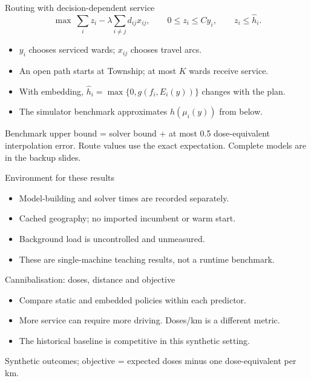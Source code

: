 \begin{frame}{Routing with decision-dependent service}
  \[
    \max\ \sum_i z_i-\lambda\sum_{i\ne j}d_{ij}x_{ij},\qquad
    0\le z_i\le Cy_i,\qquad z_i\le \widehat h_i.
  \]
  \begin{itemize}
    \item $y_i$ chooses serviced wards; $x_{ij}$ chooses travel arcs.
    \item An open path starts at Township; at most $K$ wards receive service.
    \item With embedding, $\widehat h_i=\max\{0,g(f_i,E_i(y))\}$ changes with the plan.
    \item The simulator benchmark approximates $h(\mu_i(y))$ from below.
  \end{itemize}
  \vspace{3mm}
  Benchmark upper bound = solver bound + at most 0.5 dose-equivalent interpolation error. Route values use the exact expectation. Complete models are in the backup slides.
\end{frame}

\begin{frame}{Environment for these results}
  \small
  \RunEnvironment
  \vspace{3mm}
  \begin{itemize}
    \item Model-building and solver times are recorded separately.
    \item Cached geography; no imported incumbent or warm start.
    \item Background load is uncontrolled and unmeasured.
    \item These are single-machine teaching results, not a runtime benchmark.
  \end{itemize}
\end{frame}

\begin{frame}{Cannibalisation: doses, distance and objective}
  \centering
  \ScenarioA
  \vspace{3mm}
  \begin{itemize}
    \item Compare static and embedded policies within each predictor.
    \item More service can require more driving. Doses/km is a different metric.
    \item The historical baseline is competitive in this synthetic setting.
  \end{itemize}
  \vspace{1mm}\small Synthetic outcomes; objective = expected doses minus one dose-equivalent per km.
\end{frame}

